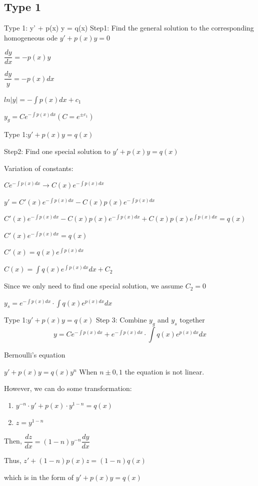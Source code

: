 \documentclass{beamer}
\begin{document}
\subsection {Type 1}
\begin{frame}{Type 1:  y' + p(x) y = q(x) }
Step1: Find the general solution to the corresponding homogeneous ode $y' + p(x)y = 0$
    
   \centering
    $\dfrac{dy}{dx} = -p(x) y$    
        
    $\dfrac{dy}{y} = -p(x)dx$

    $ln|y| = -\int p(x)dx + c_1$
    
    $y_g = C e^{-\int p(x)dx} (C = e^{\pm c_1})$

\end{frame}

\begin{frame}{Type 1:$y' + p(x) y = q(x)$}

Step2: Find one special solution to $y' + p(x) y = q(x)$

\centering
Variation of constants: 

$Ce^{-\int p(x)dx} \rightarrow C(x)e^{-\int p(x)dx}$

$y' = C'(x)e^{-\int p(x)dx} - C(x)p(x) e^{-\int p(x)dx}$

$C'(x)e^{-\int p(x)dx} - C(x)p(x) e^{-\int p(x)dx} + C(x)p(x)e^{\int p(x)dx} = q(x)$

$C'(x)e^{-\int p(x)dx} = q(x)$

$C'(x) = q(x)e^{\int p(x)dx}$

$C(x) = \int q(x)e^{\int p(x)dx} dx + C_2$

Since we only need to find one special solution, we assume $C_2 = 0$

$y_s = e^{-\int p(x)dx}\cdot \int q(x)e^{p(x)dx} dx$
\end{frame}



\begin{frame}{Type 1:$y' + p(x) y = q(x)$}
    Step 3: Combine $y_g$ and $y_s$ together
\begin{equation*}
    y = Ce^{-\int p(x)dx} + e^{-\int p(x)dx}\cdot \int q(x)e^{p(x)dx} dx
\end{equation*}
\end{frame}

\begin{frame}{Bernoulli's equation}
\begin{block}{$y' + p(x)y = q(x) y^n$}
When $n\pm 0, 1$ the equation is not linear.

However, we can do some transformation:
\begin{enumerate}
    \item $y^{-n}\cdot y' + p(x) \cdot y^{1-n} = q(x)$
    \item $z = y^{1-n}$
\end{enumerate}
    Then, $\dfrac{dz}{dx} = (1-n)y^{-n}\dfrac{dy}{dx}$
    
    Thus, $z' + (1-n)p(x) z = (1-n)q(x)$
    
    which is in the form of $y' + p(x)y = q(x)$
\end{block}
    
\end{frame}
\end{document}

